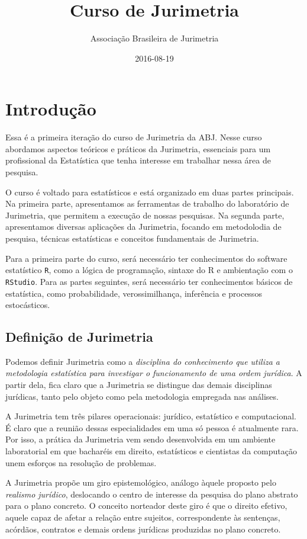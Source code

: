 \documentclass[]{book}
\title{Curso de Jurimetria}
\author{Associação Brasileira de Jurimetria}
\date{2016-08-19}
\begin{document}
\maketitle

{
\setcounter{tocdepth}{1}
\tableofcontents
}
\chapter{Introdução}\label{introducao}

Essa é a primeira iteração do curso de Jurimetria da ABJ. Nesse curso
abordamos aspectos teóricos e práticos da Jurimetria, essenciais para um
profissional da Estatística que tenha interesse em trabalhar nessa área
de pesquisa.

O curso é voltado para estatísticos e está organizado em duas partes
principais. Na primeira parte, apresentamos as ferramentas de trabalho
do laboratório de Jurimetria, que permitem a execução de nossas
pesquisas. Na segunda parte, apresentamos diversas aplicações da
Jurimetria, focando em metodolodia de pesquisa, técnicas estatísticas e
conceitos fundamentais de Jurimetria.

Para a primeira parte do curso, será necessário ter conhecimentos do
software estatístico \texttt{R}, como a lógica de programação, sintaxe
do R e ambientação com o \texttt{RStudio}. Para as partes seguintes,
será necessário ter conhecimentos básicos de estatística, como
probabilidade, verossimilhança, inferência e processos estocásticos.

\section{Definição de Jurimetria}\label{definicao-de-jurimetria}

Podemos definir Jurimetria como a \emph{disciplina do conhecimento que
utiliza a metodologia estatística para investigar o funcionamento de uma
ordem jurídica}. A partir dela, fica claro que a Jurimetria se distingue
das demais disciplinas jurídicas, tanto pelo objeto como pela
metodologia empregada nas análises.

A Jurimetria tem três pilares operacionais: jurídico, estatístico e
computacional. É claro que a reunião dessas especialidades em uma só
pessoa é atualmente rara. Por isso, a prática da Jurimetria vem sendo
desenvolvida em um ambiente laboratorial em que bacharéis em direito,
estatísticos e cientistas da computação unem esforços na resolução de
problemas.

A Jurimetria propõe um giro epistemológico, análogo àquele proposto pelo
\emph{realismo jurídico}, deslocando o centro de interesse da pesquisa
do plano abstrato para o plano concreto. O conceito norteador deste giro
é que o direito efetivo, aquele capaz de afetar a relação entre
sujeitos, correspondente às sentenças, acórdãos, contratos e demais
ordens jurídicas produzidas no plano concreto.
\end{document}
